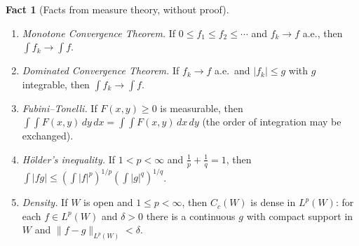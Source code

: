 \documentclass[11pt]{article}
\theoremstyle{plain}
\theoremstyle{definition}
\newtheorem{fact}[theorem]{Fact}
\theoremstyle{remark}
\begin{document}
\begin{fact}[Facts from measure theory, without proof]\label{fact:measure}
\begin{enumerate}
    \item \emph{Monotone Convergence Theorem.} If $0 \leq f_1 \leq f_2 \leq \cdots$ and $f_k \to f$ a.e., then $\int f_k \to \int f$.
    \item \emph{Dominated Convergence Theorem.} If $f_k \to f$ a.e.\ and $|f_k| \leq g$ with $g$ integrable, then $\int f_k \to \int f$.
    \item \emph{Fubini--Tonelli.} If $F(x,y) \geq 0$ is measurable, then $\int\!\!\int F(x,y)\, dy\, dx = \int\!\!\int F(x,y)\, dx\, dy$ (the order of integration may be exchanged).
    \item \emph{H\"older's inequality.} If $1 < p < \infty$ and $\frac1p + \frac1q = 1$, then $\int |fg| \leq \left(\int|f|^p\right)^{1/p}\left(\int|g|^q\right)^{1/q}$.
    \item \emph{Density.} If $W$ is open and $1 \leq p < \infty$, then $C_c(W)$ is dense in $L^p(W)$: for each $f \in L^p(W)$ and $\delta > 0$ there is a continuous $g$ with compact support in $W$ and $\|f - g\|_{L^p(W)} < \delta$.
\end{enumerate}
\end{fact}
\end{document}
